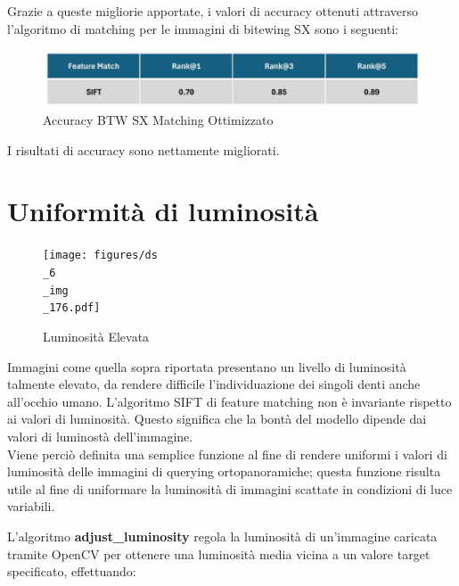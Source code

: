 \documentclass[12pt,a4paper,openright,twoside]{book}
\begin{document}
Grazie a queste migliorie apportate, i valori di accuracy ottenuti attraverso l'algoritmo di matching per le immagini di bitewing SX sono i seguenti:
\begin{figure}[H]
	\centering
	\includegraphics{figures/sx9.pdf}
    	\caption{Accuracy BTW SX Matching Ottimizzato}
	\label{fig:sx9}
\end{figure}
I risultati di accuracy sono nettamente migliorati.
\section{Uniformità di luminosità}
\begin{figure}[H]
	\centering
	\texttt{[image: figures/ds\\\_6\\\_img\\\_176.pdf]}
    	\caption{Luminosità Elevata}
	\label{fig:luminosità}
\end{figure}
Immagini come quella sopra riportata presentano un livello di luminosità talmente elevato, da rendere difficile l'individuazione dei singoli denti anche all'occhio umano. L'algoritmo SIFT di feature matching non è invariante rispetto ai valori di luminosità. Questo significa che la bontà del modello dipende dai valori di luminostà dell'immagine.\\
Viene perciò definita una semplice funzione al fine di rendere uniformi i valori di luminosità delle immagini di querying ortopanoramiche; questa funzione risulta utile al fine di uniformare la luminosità di immagini scattate in condizioni di luce variabili.
\begin{figure}[H]
    \centering
    
\end{figure}
L'algoritmo \textbf{adjust\_luminosity} regola la luminosità di un'immagine caricata tramite OpenCV per ottenere una luminosità media vicina a un valore target specificato, effettuando:
\end{document}
